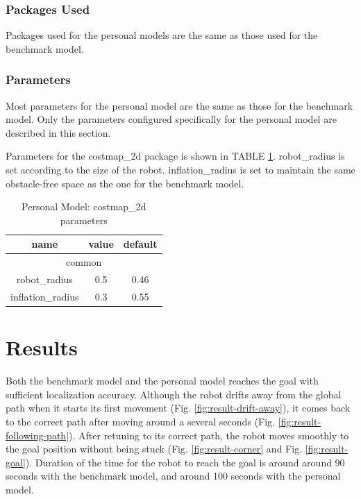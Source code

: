 \documentclass[10pt,journal,compsoc]{IEEEtran}
\begin{document}
\subsubsection{Packages Used}
Packages used for the personal models are the same as those used for the benchmark model.

\subsubsection{Parameters}
Most parameters for the personal model are the same as those for the benchmark model. Only the parameters configured specifically for the personal model are described in this section.

Parameters for the costmap\_2d package is shown in TABLE \ref{tab:personal-costmap-2d}. robot\_radius is set according to the size of the robot. inflation\_radius is set to maintain the same obstacle-free space as the one for the benchmark model.

\begin{table}[h]
\caption{Personal Model: costmap\_2d parameters}
\label{tab:personal-costmap-2d}
\begin{center}
\begin{tabular}{|c|c|c|}
\hline
name & value & default \\
\hline
\hline
\multicolumn{3}{|c|}{common} \\
\hline
robot\_radius & 0.5 & 0.46\\
\hline
inflation\_radius & 0.3 & 0.55\\
\hline
\end{tabular}
\end{center}
\end{table}

\section{Results}
\label{sec:results}
Both the benchmark model and the personal model reaches the goal with sufficient localization accuracy. Although the robot drifts away from the global path when it starts its first movement (Fig. \ref{fig:result-drift-away}), it comes back to the correct path after moving around a several seconds (Fig. \ref{fig:result-following-path}). After retuning to its correct path, the robot moves smoothly to the goal position without being stuck (Fig. \ref{fig:result-corner} and Fig. \ref{fig:result-goal}). Duration of the time for the robot to reach the goal is around around 90 seconds with the benchmark model, and around 100 seconds with the personal model.
\end{document}
